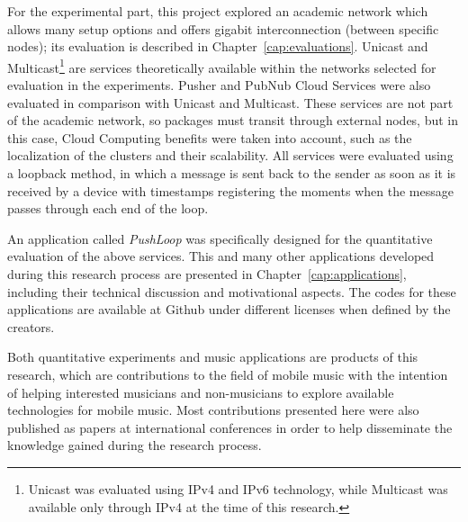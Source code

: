 For the experimental part, this project explored an academic network which allows many setup options and offers gigabit interconnection (between specific nodes); its evaluation is described in Chapter~\ref{cap:evaluations}.
Unicast and Multicast\footnote{Unicast was evaluated using IPv4 and IPv6 technology, while Multicast was available only through IPv4 at the time of this research.} are services theoretically available within the networks selected for evaluation in the experiments.
Pusher and PubNub Cloud Services were also evaluated in comparison with Unicast and Multicast.
These services are not part of the academic network, so packages must transit through external nodes, but in this case, Cloud Computing benefits were taken into account, such as the localization of the clusters and their scalability.
All services were evaluated using a loopback method, in which a message is sent back to the sender as soon as it is received by a device with timestamps registering the moments when the message passes through each end of the loop.

An application called \textit{PushLoop} was specifically designed for the quantitative evaluation of the above services.
This and many other applications developed during this research process are presented in Chapter~\ref{cap:applications}, including their technical discussion and motivational aspects.
The codes for these applications are available at Github under different licenses when defined by the creators.

Both quantitative experiments and music applications are products of this research, which are contributions to the field of mobile music with the intention of helping interested musicians and non-musicians to explore available technologies for mobile music.
Most contributions presented here were also published as papers at international conferences in order to help disseminate the knowledge gained during the research process.





